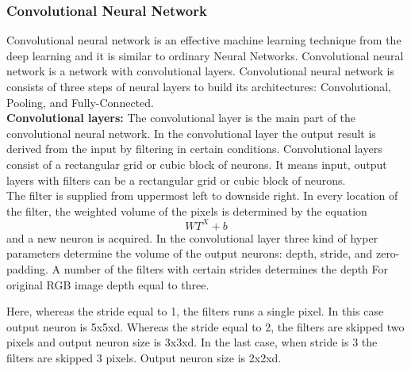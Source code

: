\documentclass[12pt,a4paper]{article}
\begin{document}
\subsubsection{Convolutional Neural Network}
Convolutional neural network is an effective machine learning technique from the deep learning and it is similar to ordinary Neural Networks. Convolutional neural network is a network with convolutional layers. Convolutional neural network is consists of three steps of neural layers to build its architectures: Convolutional, Pooling, and Fully-Connected.\\ \newline
\textbf{Convolutional layers:}
		The convolutional layer is the main part of the convolutional neural network. In the convolutional layer the output result is derived from the input by filtering in certain conditions.
		Convolutional layers consist of a rectangular grid or cubic block of neurons. It means input, output layers with filters can be a rectangular grid or cubic block of neurons.\\
		
		The filter is supplied from uppermost left to downside right. In every location of the filter, the weighted volume of the pixels is determined by the equation \begin{equation}WT^X + b\end{equation}and a new neuron is acquired.
		In the convolutional layer three kind of hyper parameters determine the volume of the output neurons: depth, stride, and zero-padding.
		A number of the filters with certain strides determines the depth For original RGB image depth equal to three.

		Here, whereas the stride equal to 1, the filters runs a single pixel. In this case output neuron is 5x5xd. Whereas the stride equal to 2, the filters are skipped two pixels and output neuron size is 3x3xd. In the last case, when stride is 3 the filters are skipped 3 pixels. Output neuron size is 2x2xd.
		
\end{document}
